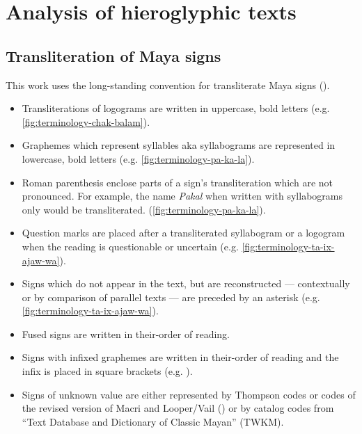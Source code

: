 \documentclass[../main.tex]{subfiles}
\begin{document}
\section{Analysis of hieroglyphic texts}

\subsection{Transliteration of Maya signs}
This work uses the long-standing convention for transliterate Maya signs (\cite{jamesjusteson1984}).
\begin{itemize}
    \item Transliterations of logograms are written in uppercase, bold letters 
          (e.g. \cref{fig:terminology-chak-balam}).
    \item Graphemes which represent syllables aka syllabograms are represented in 
          lowercase, bold letters (e.g. \cref{fig:terminology-pa-ka-la}).
    \item Roman parenthesis enclose parts of a sign's transliteration which are not pronounced.
          For example, the name \emph{Pakal} when written with syllabograms only would be 
          transliterated.
          (\cref{fig:terminology-pa-ka-la}).
    \item Question marks are placed after a transliterated syllabogram or a 
          logogram when the reading is questionable or uncertain 
          (e.g. \cref{fig:terminology-ta-ix-ajaw-wa}).
    \item Signs which do not appear in the text, but are reconstructed 
          --- contextually or by comparison of parallel texts --- are preceded by an asterisk
          (e.g. \cref{fig:terminology-ta-ix-ajaw-wa}).
    \item Fused signs are written in their-order of reading.
    \item Signs with infixed graphemes are written in their-order of reading and the infix is placed
          in square brackets 
          (e.g. ).
    \item Signs of unknown value are either represented by Thompson codes or codes of the 
          revised version of Macri and Looper/Vail (\cites{macrilooper2003}{macrivail2009}) 
          or by catalog codes from ``Text Database and Dictionary of Classic Mayan'' (TWKM).
\end{itemize}
\end{document}
